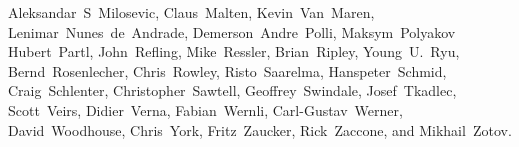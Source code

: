 {Aleksandar~S~Milosevic, %
Claus~Malten,           %
Kevin~Van~Maren,        %
Lenimar~Nunes~de~Andrade, %
Demerson~Andre~Polli,   %
Maksym~Polyakov         %
Hubert~Partl,           %
John~Refling,           %
Mike~Ressler,           %
Brian~Ripley,           %
Young~U.~Ryu,           %
Bernd~Rosenlecher,      %
Chris~Rowley,           %
Risto~Saarelma,         %
Hanspeter~Schmid,       %
Craig~Schlenter,        %
Christopher~Sawtell,    %
Geoffrey~Swindale,      %
Josef~Tkadlec,          %
Scott~Veirs,            %
Didier~Verna,           %
Fabian~Wernli,          %
Carl-Gustav~Werner,     %
David~Woodhouse,        %
Chris~York,             %
Fritz~Zaucker,          %
Rick~Zaccone,           %
and Mikhail~Zotov.      %

}




\pagebreak
\endinput
